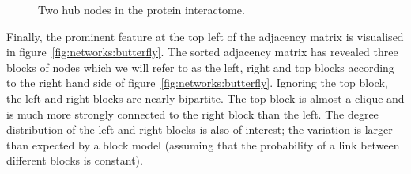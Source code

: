 \begin{figure}[ht]
  \centering
{}
  \caption{Two hub nodes in the protein interactome.}
  \label{fig:networks:hubs}
\end{figure}

Finally, the prominent feature at the top left of the adjacency matrix is visualised in figure~\ref{fig:networks:butterfly}.
The sorted adjacency matrix has revealed three blocks of nodes which we will refer to as the left, right and top blocks according to the right hand side of figure~\ref{fig:networks:butterfly}.
Ignoring the top block, the left and right blocks are nearly bipartite.
The top block is almost a clique and is much more strongly connected to the right block than the left.
The degree distribution of the left and right blocks is also of interest; the variation is larger than expected by a block model (assuming that the probability of a link between different blocks is constant).

